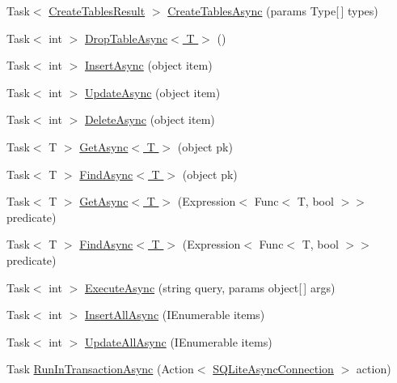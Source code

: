 \begin{DoxyCompactItemize}
\item 
Task$<$ \hyperlink{class_s_q_lite_1_1_create_tables_result}{Create\+Tables\+Result} $>$ \hyperlink{class_s_q_lite_1_1_s_q_lite_async_connection_af98ef3fd9628a9cda7b2b0532291f04b}{Create\+Tables\+Async} (params Type\mbox{[}$\,$\mbox{]} types)
\item 
Task$<$ int $>$ \hyperlink{class_s_q_lite_1_1_s_q_lite_async_connection_a6781339fb664cde6494460e686f5cb60}{Drop\+Table\+Async$<$ T $>$} ()
\item 
Task$<$ int $>$ \hyperlink{class_s_q_lite_1_1_s_q_lite_async_connection_a7c621805c4f3185e9b064288b2b47d4a}{Insert\+Async} (object item)
\item 
Task$<$ int $>$ \hyperlink{class_s_q_lite_1_1_s_q_lite_async_connection_a3950c4feb7a8d2964a42167d8a4516a0}{Update\+Async} (object item)
\item 
Task$<$ int $>$ \hyperlink{class_s_q_lite_1_1_s_q_lite_async_connection_ac34ee6c331f35dc8cbb73a0373315fb0}{Delete\+Async} (object item)
\item 
Task$<$ T $>$ \hyperlink{class_s_q_lite_1_1_s_q_lite_async_connection_a59792569de902bd2e87b967a35154d4c}{Get\+Async$<$ T $>$} (object pk)
\item 
Task$<$ T $>$ \hyperlink{class_s_q_lite_1_1_s_q_lite_async_connection_a4e09e6aacf646853516ab1befea4ac4b}{Find\+Async$<$ T $>$} (object pk)
\item 
Task$<$ T $>$ \hyperlink{class_s_q_lite_1_1_s_q_lite_async_connection_ad3e092c3fee0a61611570e8e86dbb88e}{Get\+Async$<$ T $>$} (Expression$<$ Func$<$ T, bool $>$$>$ predicate)
\item 
Task$<$ T $>$ \hyperlink{class_s_q_lite_1_1_s_q_lite_async_connection_ab3ee9b32ac49766e4ac20fa697e91f99}{Find\+Async$<$ T $>$} (Expression$<$ Func$<$ T, bool $>$$>$ predicate)
\item 
Task$<$ int $>$ \hyperlink{class_s_q_lite_1_1_s_q_lite_async_connection_aa61f9b65944e23c32cac8b0e2c39d597}{Execute\+Async} (string query, params object\mbox{[}$\,$\mbox{]} args)
\item 
Task$<$ int $>$ \hyperlink{class_s_q_lite_1_1_s_q_lite_async_connection_a8caf48d01bf96785143e71ee6a12b6a0}{Insert\+All\+Async} (I\+Enumerable items)
\item 
Task$<$ int $>$ \hyperlink{class_s_q_lite_1_1_s_q_lite_async_connection_a42b8f062eb54f8649a2ccff9984b536e}{Update\+All\+Async} (I\+Enumerable items)
\item 
Task \hyperlink{class_s_q_lite_1_1_s_q_lite_async_connection_affd521039f3a7da49746af600522c809}{Run\+In\+Transaction\+Async} (Action$<$ \hyperlink{class_s_q_lite_1_1_s_q_lite_async_connection}{S\+Q\+Lite\+Async\+Connection} $>$ action)

\end{DoxyCompactItemize}
